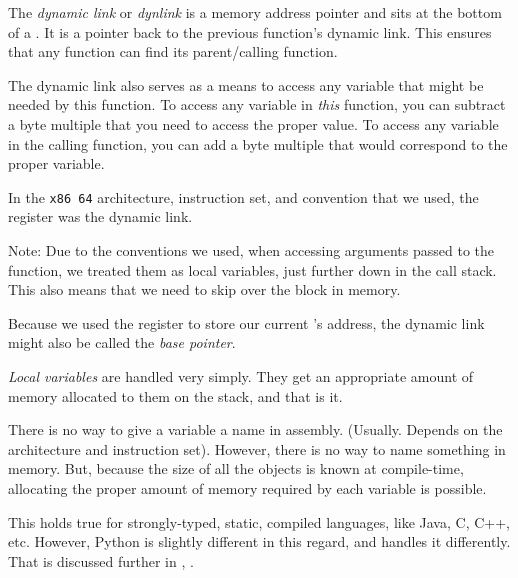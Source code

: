 \begin{definition}\label{def:Dynamic_Link}
  The \emph{dynamic link} or \emph{dynlink} is a memory address pointer and sits at the bottom of a .
  It is a pointer back to the previous function's dynamic link.
  This ensures that any function can find its parent/calling function.

  The dynamic link also serves as a means to access any variable that might be needed by this function.
  To access any variable in \emph{this} function, you can subtract a byte multiple that you need to access the proper value.
  To access any variable in the calling function, you can add a byte multiple that would correspond to the proper variable.

    In the \texttt{x86\textunderscore{} 64} architecture, instruction set, and convention that we used, the register \rbpRegister{} was the dynamic link.
  \begin{remark}
    Note: Due to the conventions we used, when accessing arguments passed to the function, we treated them as local variables, just further down in the call stack.
    This also means that we need to skip over the  block in memory.
  \end{remark}

  \begin{remark}
    Because we used the \rbpRegister{} register to store our current 's address, the dynamic link might also be called the \emph{base pointer}.
  \end{remark}
\end{definition}

\begin{definition}\label{def:Local_Variable}
  \emph{Local variables} are handled very simply.
  They get an appropriate amount of memory allocated to them on the stack, and that is it.

  There is no way to give a variable a name in assembly. (Usually. Depends on the architecture and instruction set).
  However, there is no way to name something in memory.
  But, because the size of all the objects is known at compile-time, allocating the proper amount of memory required by each variable is possible.

  \begin{remark}
    This holds true for strongly-typed, static, compiled languages, like Java, C, C++, etc.
    However, Python is slightly different in this regard, and handles it differently.
    That is discussed further in , .
  \end{remark}
\end{definition}

